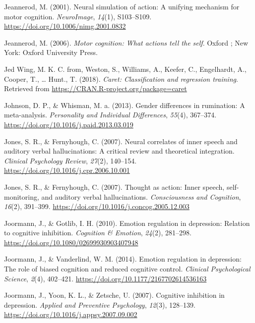 \documentclass[a4paper,12pt,twoside,onecolumn,openright,final,oldfontcommands]{memoir}
\begin{document}
\leavevmode\hypertarget{ref-jeannerod_neural_2001}{}%
Jeannerod, M. (2001). Neural simulation of action: A unifying mechanism for motor cognition. \emph{NeuroImage}, \emph{14}(1), S103--S109. \url{https://doi.org/10.1006/nimg.2001.0832}

\leavevmode\hypertarget{ref-jeannerod_motor_2006}{}%
Jeannerod, M. (2006). \emph{Motor cognition: What actions tell the self}. Oxford ; New York: Oxford University Press.

\leavevmode\hypertarget{ref-R-caret}{}%
Jed Wing, M. K. C. from, Weston, S., Williams, A., Keefer, C., Engelhardt, A., Cooper, T., \ldots{} Hunt., T. (2018). \emph{Caret: Classification and regression training}. Retrieved from \url{https://CRAN.R-project.org/package=caret}

\leavevmode\hypertarget{ref-Johnson2013}{}%
Johnson, D. P., \& Whisman, M. a. (2013). Gender differences in rumination: A meta-analysis. \emph{Personality and Individual Differences}, \emph{55}(4), 367--374. \url{https://doi.org/10.1016/j.paid.2013.03.019}

\leavevmode\hypertarget{ref-jones_neural_2007}{}%
Jones, S. R., \& Fernyhough, C. (2007). Neural correlates of inner speech and auditory verbal hallucinations: A critical review and theoretical integration. \emph{Clinical Psychology Review}, \emph{27}(2), 140--154. \url{https://doi.org/10.1016/j.cpr.2006.10.001}

\leavevmode\hypertarget{ref-Jones2007}{}%
Jones, S. R., \& Fernyhough, C. (2007). Thought as action: Inner speech, self-monitoring, and auditory verbal hallucinations. \emph{Consciousness and Cognition}, \emph{16}(2), 391--399. \url{https://doi.org/10.1016/j.concog.2005.12.003}

\leavevmode\hypertarget{ref-joormann_emotion_2010}{}%
Joormann, J., \& Gotlib, I. H. (2010). Emotion regulation in depression: Relation to cognitive inhibition. \emph{Cognition \& Emotion}, \emph{24}(2), 281--298. \url{https://doi.org/10.1080/02699930903407948}

\leavevmode\hypertarget{ref-joormann_emotion_2014}{}%
Joormann, J., \& Vanderlind, W. M. (2014). Emotion regulation in depression: The role of biased cognition and reduced cognitive control. \emph{Clinical Psychological Science}, \emph{2}(4), 402--421. \url{https://doi.org/10.1177/2167702614536163}

\leavevmode\hypertarget{ref-joormann_cognitive_2007}{}%
Joormann, J., Yoon, K. L., \& Zetsche, U. (2007). Cognitive inhibition in depression. \emph{Applied and Preventive Psychology}, \emph{12}(3), 128--139. \url{https://doi.org/10.1016/j.appsy.2007.09.002}
\end{document}
